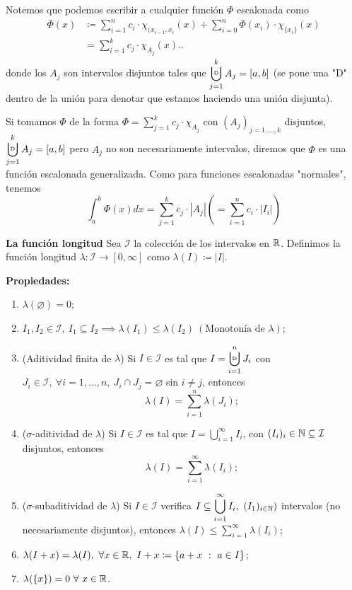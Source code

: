 \documentclass[a4paper]{report}
\newcommand{\bigcupd}{\mathop{\ensurestackMath{\stackinset{l}{}{c}{+.25ex}{\hspace{3pt}{\text{\tiny{D}}}}{\displaystyle{\bigcup}}}}}
\begin{document}
	Notemos que podemos escribir a cualquier función $\Phi$ escalonada como
	\begin{align*}
		\Phi (x) & \coloneq \sum_{i=1}^{n} c_i \cdot \chi_{(x_{i-1},x_i}(x) + \sum_{i=0}^{n} \Phi(x_i) \cdot \chi_{\{x_i\}}(x) \\
		& = \sum_{i=1}^{k} c_j \cdot \chi_{A_j}(x).
	.\end{align*}
	\noindent donde los $A_j$ son intervalos disjuntos tales que $\displaystyle\bigcupd_{j=1}^{k} A_j = [a,b]$ (se pone una "D" dentro de la unión para denotar que estamos haciendo una unión disjunta).

	Si tomamos $\Phi$ de la forma $\Phi = \sum_{j=1}^{k} c_j \cdot \chi_{A_j}$ con $(A_j)_{j=1,\dots,k}$ disjuntos, $\displaystyle\bigcupd_{j=1}^{k} A_j = [a,b]$ pero $A_j$  no son necesariamente intervalos, diremos que $\Phi$ es una función escalonada generalizada. Como para funciones escalonadas "normales", tenemos
	\[
	\int_{a}^{b} \Phi (x) dx = \sum_{j=1}^{k} c_j \cdot |A_j| \left( = \sum_{i=1}^{n} c_i \cdot |I_i| \right)
	\]

	\noindent \textbf{La función longitud}
	Sea $\mathcal{I}$ la colección de los intervalos en $\mathbb{R}$. Definimos la función longitud $\lambda : \mathcal{I} \to [0,\infty]$ como $\lambda (I) \coloneq |I|$.
	
	\noindent \textbf{Propiedades:}
	\begin{enumerate}
		\item $\lambda (\varnothing) = 0$;

		\item $I_1,I_2 \in \mathcal{I},\ I_1\subseteq I_2 \implies \lambda (I_1) \leq \lambda (I_2) \ (\text{Monotonía de } \lambda)$;

		\item (Aditividad finita de $\lambda$) Si $I \in \mathcal{I}$ es tal que $I = \displaystyle\bigcupd_{i=1}^{n} J_i$ con $J_i \in \mathcal{I},\ \forall i = 1,\dots,n,\ J_i \cap J_j = \varnothing$ sin $i\neq j$, entonces
		\[
		\lambda (I) = \sum_{i=1}^{n} \lambda (J_i);
		\]

		\item ($\sigma$-aditividad de $\lambda$) Si $I \in \mathcal{I}$ es tal que $I = \displaystyle\bigcup_{i=1}^{\infty} I_i $, con $(I_i)_{i} \in \mathbb{N} \subseteq \mathcal{I}$ disjuntos, entonces
		\[
		\lambda(I) = \sum_{i=1}^{\infty} \lambda (I_i)
		;\]

		\item ($\sigma$-subaditividad de $\lambda$) Si $I \in \mathcal{I}$ verifica $I \subseteq \displaystyle\bigcup_{i=1}^{\infty} I_i, \ (I_1)_{i \in \mathbb{N}})$ intervalos (no necesariamente disjuntos), entonces $\lambda (I) \leq \sum_{i=1}^{\infty} \lambda (I_i)$;

		\item $\lambda (I + x) = \lambda (I), \ \forall x \in \R, \ I+x \coloneq \{a + x \ : \ a \in I \} $;

		\item $\lambda(\{x\}) = 0 \ \forall \ x \in \mathbb{R}$.  
	\end{enumerate}
\end{document}
